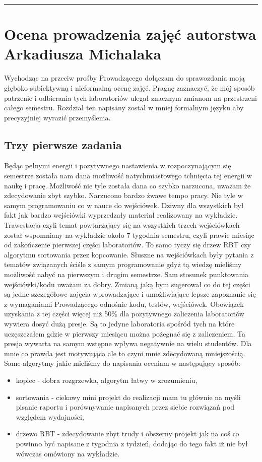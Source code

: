 \documentclass[a4paper,11pt]{article}
\newcommand{\linia}{\rule{\linewidth}{0.4mm}}
\begin{document}
\noindent\linia
\section{Ocena prowadzenia zajęć autorstwa Arkadiusza Michalaka}
Wychodząc na przeciw prośby Prowadzącego dołączam do sprawozdania moją głęboko subiektywną i nieformalną ocenę zajęć. Pragnę zaznaczyć, że mój sposób patrzenie i odbierania tych laboratoriów ulegał znacznym zmianom na przestrzeni całego semestru. Rozdział ten napisany został w mniej formalnym języku aby precyzyjniej wyrazić przemyślenia.
\subsection{Trzy pierwsze zadania}
Będąc pełnymi energii i pozytywnego nastawienia w rozpoczynającym się semestrze została nam dana możliwość natychmiastowego tchnięcia tej energii w naukę i pracę. Możliwość nie tyle została dana co szybko narzucona, uważam że zdecydowanie zbyt szybko. Narzucono bardzo żwawe tempo pracy. Nie tyle w samym programowaniu co w nauce do wejściówek. Dziwny dla wszystkich był fakt jak bardzo wejściówki wyprzedzały materiał realizowany na wykładzie. Trawestacja czyli temat powtarzający się na wszystkich trzech wejściówkach został wspomniany na wykładzie około 7 tygodnia semestru, czyli prawie miesiąc od zakończenie pierwszej części laboratoriów. To samo tyczy się drzew RBT czy algorytmu sortowania przez kopcowanie. Słuszne na wejściówkach były pytania z tematów związanych ściśle z samym programowanie gdyż tą wiedzę mieliśmy możliwość nabyć na pierwszym i drugim semestrze. Sam stosunek punktowania wejściówki/kodu uważam za dobry. Zmianą jaką bym sugerował co do tej części są jedne szczegółowe zajęcia wprowadzające i umożliwiające lepsze zapoznanie się z wymaganiami Prowadzącego odnośnie kodu, testów, wejściówek. Obowiązek uzyskania z tej części więcej niż 50\% dla pozytywnego zaliczenia laboratoriów wywiera dosyć dużą presje. Są to jedyne laboratoria spośród tych na które uczęszczałem gdzie w pierwszy miesiącu można pożegnać się z zaliczeniem. Ta presja wywarta na samym wstępne wpływa negatywnie na wielu studentów. Dla mnie co prawda jest motywująca ale to czyni mnie zdecydowaną mniejszością. Same algorytmy jakie mieliśmy do napisania oceniam w następujący sposób:
\begin{itemize}
\item kopiec - dobra rozgrzewka, algorytm łatwy w zrozumieniu,
\item sortowania - ciekawy mini projekt do realizacji mam tu głównie na myśli pisanie raportu i porównywanie napisanych przez siebie rozwiązań pod względem wydajności,
\item drzewo RBT - zdecydowanie zbyt trudy i obszerny projekt jak na coś co powinno być napisane z tygodnia z tydzień, dodając do tego fakt iż nie był wówczas omówiony na wykładzie.
\end{itemize}
\end{document}
